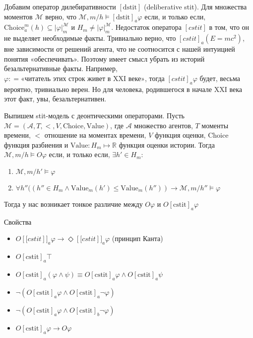 \documentclass[openany]{book}
\theoremstyle{plain}
\theoremstyle{definition}
\begin{document}
Добавим оператор дилебиративности \([\mathrm{dstit}]\) (deliberative stit). Для множества моментов \(\mathcal{M}\) верно, что \(\mathcal{M}, m/h \models [\mathrm{dstit}]_a \varphi\) если, и только если,  \(\mathrm{Choice}_a^m (h) \subseteq |\varphi|_m^{\mathcal{M}}\) и \(H_m \not=|\varphi|_m^{\mathcal{M}} \). Недостаток оператора \([cstit]\) в том, что он не выделяет необходимые факты. Тривиально верно, что \([cstit]_a (E = m c^2)\), вне зависимости от решений агента, что не соотносится с нашей интуицией понятия «обеспечивать». Поэтому имеет смысл убрать из историй безальтернативные факты. Например, \(\varphi : = \text{«читатель этих строк живет в XXI веке»}\), тогда \([cstit]_a \varphi\) будет, весьма вероятно, тривиально верен. Но для человека, родившегося в начале XXI века этот факт, увы, безальтернативен. 

Выпишем stit-модель с деонтическими операторами. Пусть \(\mathcal{M} = (\mathcal{A}, T, <, V, \mathrm{Choice}, \mathrm{Value})\), где \(\mathcal{A}\) множество агентов, \(T\) моменты времени, \(<\) отношение на моментах времени, \(V\) функция оценки, \(\mathrm{Choice}\) функция разбиения и \(\mathrm{Value} : H_m \mapsto \mathbb{R} \) функция оценки истории. Тогда \(\mathcal{M}, m/h \models O \varphi\) если, и только если, \(\exists h' \in H_m\):
\begin{enumerate}
    \item\(\mathcal{M}, m/h' \models \varphi\)
    \item\(\forall h''((h'' \in H_m \land \mathrm{Value}_m (h') \leq \mathrm{Value}_m (h'')) \to \mathcal{M}, m/h'' \models \varphi\)
\end{enumerate}

Тогда у нас возникает тонкое различие между \(O \varphi\) и \(O [\mathrm{cstit}]_a \varphi\)

Свойства
\begin{itemize}
    \item \(O [\mathrm[cstit]]_a \varphi \to \Diamond [\mathrm[cstit]]_a \varphi\) (принцип Канта)
    \item \(O [\mathrm{cstit}]_a \top\) 
    \item \(O [\mathrm{cstit}]_a (\varphi \land \psi) \equiv O [\mathrm{cstit}]_a \varphi \land O [\mathrm{cstit}]_a \psi\)
    \item \(\neg (O [\mathrm{cstit}]_a \varphi \land O [\mathrm{cstit}]_a \neg \varphi)\)
    \item \(\neg (O [\mathrm{cstit}]_a \varphi \land O [\mathrm{cstit}]_b \neg \varphi)\)
    \item \(O [\mathrm{cstit}]_a \varphi \to O \varphi\)
\end{itemize}
\end{document}
